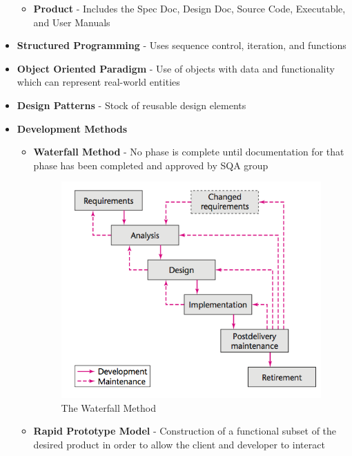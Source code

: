 \documentclass{report}
\begin{document}
\begin{itemize}
\begin{itemize}
				\item \textbf{Product} - Includes the Spec Doc, Design Doc, Source Code, Executable, and User Manuals
			\end{itemize}
		\item \textbf{Structured Programming} - Uses sequence control, iteration, and functions
		\item \textbf{Object Oriented Paradigm} - Use of objects with data and functionality which can represent real-world entities
		\item \textbf{Design Patterns} - Stock of reusable design elements
		\item \textbf{Development Methods}
			\begin{itemize}
				\item \textbf{Waterfall Method} - No phase is complete until documentation for that phase has been completed and approved by SQA group
				\begin{figure}
					\includegraphics[width=1\textwidth]{waterfall.png}
					\caption{The Waterfall Method}
				\end{figure}
				\item \textbf{Rapid Prototype Model} - Construction of a functional subset of the desired product in order to allow the client and developer to interact
				\begin{figure}

\end{figure}
\end{itemize}
\end{itemize}
\end{document}
